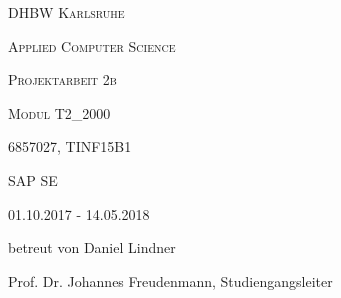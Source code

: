 \makeatletter
\begin{titlepage}
\centering
	{\scshape\LARGE DHBW Karlsruhe \par}
	{\scshape Applied Computer Science \par}
	\vspace{1cm}
	{\scshape\Large Projektarbeit 2b\par}
	{\scshape\Large Modul T2\_2000\par}
	\vspace{1.5cm}
	{\huge\textbf{\@title} \par}
	\vspace{2cm}
	{\Large \@author \par}
	{\Large 6857027, TINF15B1 \par}
	\vspace{6cm}
	
	{\scshape
	{\Large SAP SE\par}
	01.10.2017 - 14.05.2018\par
	betreut von Daniel Lindner \par 
	Prof. Dr. Johannes Freudenmann, Studiengangsleiter}

\end{titlepage}